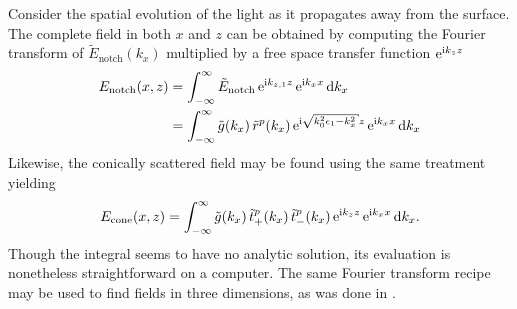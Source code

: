 Consider the spatial evolution of the light as it propagates
away from the surface.
The complete field in both $x$ and $z$ can be obtained by computing
the Fourier transform of $\tilde{E}_\mathrm{notch}(k_x)$ multiplied
by a free space transfer function ${\mathrm{e}}^{{\mathrm{i}} k_{z} z}$
\begin{align}
	E_\mathrm{notch}(x,z) & = \intinfty \tilde{E}_\mathrm{notch}\, \me^{\mi k_{z,1} z}\, \me^{\mi k_x x} \md k_x                                 \\
	                      & = \intinfty \tilde{g}(k_x)\, \tilde{r}^p(k_x)\, \me^{\mi \sqrt{k_0^2 \epsilon_1 - k_x^2}z}\, \me^{\mi k_x x} \md k_x
	\label{eqn:fourier123}
\end{align}
Likewise, the conically scattered field may be found using the same
treatment yielding
\begin{align}
	E_\text{cone}(x,z) = \int_{-\infty}^{\infty} \tilde{g}(k_x)\,
	\tilde{t}^p_+(k_x)\, \tilde{t}^p_-(k_x)\,{\mathrm{e}}^{{\mathrm{i}} k_z z}\, {\mathrm{e}}^{{\mathrm{i}} k_x x}
	\,\mathrm{d} k_x.
	\label{eqn:fourier321}
\end{align}
Though the integral seems to have no analytic solution, its evaluation is
nonetheless straightforward on a computer.  The same Fourier transform
recipe may be used to find fields in three dimensions, as was done in
.

